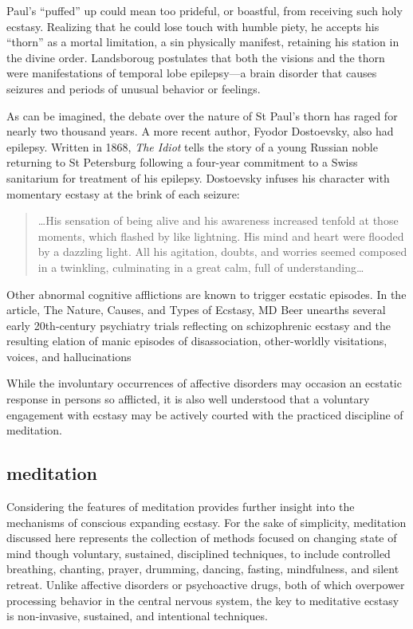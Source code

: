 \documentclass{UIdahoMastersThesis}
\begin{document}
Paul's ``puffed'' up could mean too prideful, or boastful, from receiving such holy ecstasy. Realizing that he could lose touch with humble piety, he accepts his ``thorn'' as a mortal limitation, a sin physically manifest, retaining his station in the divine order. Landsboroug postulates that both the visions and the thorn were manifestations of temporal lobe epilepsy---a brain disorder that causes seizures and periods of unusual behavior or feelings.

As can be imagined, the debate over the nature of St Paul's thorn has raged for nearly two thousand years. A more recent author, Fyodor Dostoevsky, also had epilepsy. Written in 1868, \emph{The Idiot} tells the story of a young Russian noble returning to St Petersburg following a four-year commitment to a Swiss sanitarium for treatment of his epilepsy. Dostoevsky infuses his character with momentary ecstasy at the brink of each seizure:

\begin{quote}
{\ldots His sensation of being alive and his awareness increased tenfold at those moments, which flashed by like lightning. His mind and heart were flooded by a dazzling light. All his agitation, doubts, and worries seemed composed in a twinkling, culminating in a great calm, full of understanding\ldots}\cite{bible_new_1984}
\end{quote}

Other abnormal cognitive afflictions are known to trigger ecstatic episodes. In the article, The Nature, Causes, and Types of Ecstasy, MD Beer unearths several early 20th-century psychiatry trials reflecting on schizophrenic ecstasy and the resulting elation of manic episodes of disassociation, other-worldly visitations, voices, and hallucinations \cite{beer_nature_2000}

While the involuntary occurrences of affective disorders may occasion an ecstatic response in persons so afflicted, it is also well understood that a voluntary engagement with ecstasy may be actively courted with the practiced discipline of meditation.

\subsection{meditation}

Considering the features of meditation provides further insight into the mechanisms of conscious expanding ecstasy. For the sake of simplicity, meditation discussed here represents the collection of methods focused on changing state of mind though voluntary, sustained, disciplined techniques, to include controlled breathing, chanting, prayer, drumming, dancing, fasting, mindfulness, and silent retreat. Unlike affective disorders or psychoactive drugs, both of which overpower processing behavior in the central nervous system, the key to meditative ecstasy is non-invasive, sustained, and intentional techniques.
\end{document}
